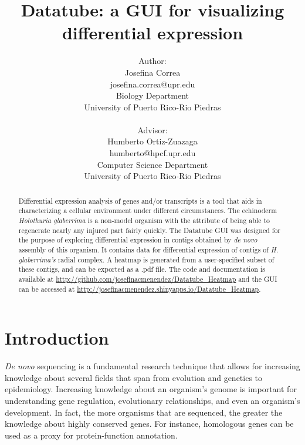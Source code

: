 \documentclass[12pt]{article}
\begin{document}
\title{Datatube: a GUI for visualizing differential expression}
\author{Author:
			\\Josefina Correa
			\\josefina.correa@upr.edu
            \\Biology Department
            \\University of Puerto Rico-Rio Piedras
            \\	
            \\Advisor:
            	\\Humberto Ortiz-Zuazaga
                \\humberto@hpcf.upr.edu
                \\Computer Science Department
                \\University of Puerto Rico-Rio Piedras}
            			

\maketitle
\begin{abstract}
Differential expression analysis of genes and/or transcripts is a tool that aids in characterizing a cellular environment under different circumstances. The echinoderm \textit{Holothuria glaberrima} is a non-model organism with the attribute of being able to regenerate nearly any injured part fairly quickly. The Datatube GUI was designed for the purpose of exploring differential expression in contigs obtained by \textit{de novo} assembly of this organism. It contains data for differential expression of contigs of \textit{H. glaberrima's} radial complex. A heatmap is generated from a user-specified subset of these contigs, and can be exported as a .pdf file. The code and documentation is available at \url{http://github.com/josefinacmenendez/Datatube_Heatmap} and the GUI can be accessed at \url{http://josefinacmenendez.shinyapps.io/Datatube_Heatmap}. 

\end{abstract}


\section{Introduction}
\textit{De novo} sequencing is a fundamental research technique that allows for increasing knowledge about several fields that span from evolution and genetics to epidemiology. Increasing knowledge about an organism's genome is important for understanding gene regulation, evolutionary relationships, and even an organism's development. In fact, the more organisms that are sequenced, the greater the knowledge about highly conserved genes. For instance, homologous genes can be used as a proxy for protein-function annotation. \cite{Lowenstein09}  
	
\end{document}
